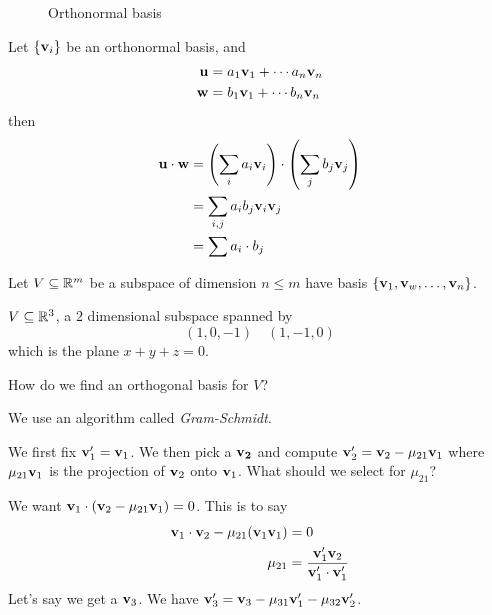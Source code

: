 \begin{figure}[ht!]
    \begin{center}
    \end{center}
    \caption{Orthonormal basis }
\end{figure}

Let $\left\{ \mathbf{v}_i \right\}$ be an orthonormal basis, and
\begin{align*}
    \mathbf{u} & = a_1\mathbf{v}_1 + \cdots a_n\mathbf{v}_n \\
    \mathbf{w} & = b_1\mathbf{v}_1 + \cdots b_n\mathbf{v}_n \\
\end{align*}
then
\begin{align*}
    \mathbf{u}\cdot \mathbf{w} & = \left( \sum_i a_i\mathbf{v}_i \right)\cdot \left( \sum_j b_j \mathbf{v}_j \right) \\
                           & = \sum_{i, j} a_i b_j \mathbf{v}_i\mathbf{v}_j                                      \\
                           & = \sum a_i\cdot b_j
\end{align*}

Let $V\subseteq \mathbb R^m$ be a subspace of dimension $n\leq m$ have basis $\{\mathbf{v}_1, \mathbf{v}_w, \dots, \mathbf{v}_n\}$.
\begin{example}
    $V\subseteq\mathbb R^3$, a $2$ dimensional subspace spanned by
    \[(1, 0, -1) \quad (1, -1, 0)\]
    which is the plane $x + y + z = 0$.
    \begin{ques*}
        How do we find an orthogonal basis for $V$?
    \end{ques*}
\end{example}

We use an algorithm called \emph{Gram-Schmidt}.

We first fix $\mathbf{v}_1' = \mathbf{v}_1$. We then pick a $\mathbf{v_2}$ and compute $\mathbf{v}_2' = \mathbf{v}_2 - \mu_{21} \mathbf{v}_1$ where $\mu_{21} \mathbf{v}_1$ is the projection of $\mathbf{v}_2$ onto $\mathbf{v}_1$. What should we select for $\mu_{21}$?

We want $\mathbf{v}_1\cdot (\mathbf{v}_2 - \mu_{21}\mathbf{v}_1) = 0$. This is to say
\begin{align*}
    \mathbf{v}_1\cdot \mathbf{v}_2 - \mu_{21}(\mathbf{v}_1\mathbf{v}_1) & = 0                                                          \\
    \mu_{21}                                                    & = \frac{\mathbf{v}_1'\mathbf{v}_2}{\mathbf{v}_1'\cdot \mathbf{v}_1'}
\end{align*}
Let's say we get a $\mathbf{v}_3$. We have $\mathbf{v}_3' = \mathbf{v}_3 - \mu_{31}\mathbf{v}_1' - \mu_{32}\mathbf{v}_2'$.

